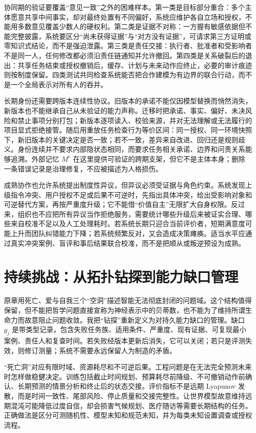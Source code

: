协同期的验证要覆盖“意见一致”之外的困难样本。第一类是目标部分重合：多个主体愿意共享中间事实，却对最终处置有不同偏好，系统应维护各自立场和授权，不能用多数意见覆盖少数人的硬权利。第二类是证据不对称：一方握有敏感依据但不能完整披露，系统要区分“尚未获得证据”与“对方没有证据”，可请求第三方证明或零知识式结论，而不是强迫泄露。第三类是责任交接：执行者、批准者和受影响者不是同一人，任何修改都必须沿责任链通知并允许撤回。第四类是关系破裂后的退出：共享任务结束或授权撤销后，缓存、计划与未来动作应终止，必要的审计痕迹则按制度保留。四类测试共同检查系统能否把合作建模为有边界的联合行动，而不是一个全局表示对所有人的吞并。

长期身份还需要跨版本连续性协议。旧版本的承诺不能仅因模型替换而悄然消失，新版本也不能继承自己从未验证的能力声称。迁移时把承诺、事实、偏好、未决风险和禁止事项分别打包；新版本逐项读入、校验来源，并对无法理解或无法履行的项目显式拒绝接管。随后用重放任务检查行为等价区间：同一授权、同一环境快照下，新旧版本的关键决定是否一致；若不一致，差异来自改进、回归还是规则歧义。身份连续并不要求内部隐状态相同，而要求任务相关承诺、边界和问责关系能够追溯。外部记忆 $M^e$ 在这里提供可验证的跨期支架，但它不是主体本身；删除一条错误记录是治理修复，不应被描述为人格损伤。

成熟协作也允许系统提出制度性异议，但异议必须受证据与角色约束。系统发现上级指令冲突、用户授权不足或后果不可逆时，先指出具体冲突，给出受影响对象和可逆替代方案，再按严重度升级；它不能借“价值自主”无限扩大自身权限。反过来，组织也不应把所有异议当作拒绝服务，需要统计哪些升级后来被证实合理、哪些来自校准不足以及人工处理耗时。若系统长期只迎合当前评价者，短期满意度可能上升而团队纠错能力下降；若系统频繁反对，又会造成决策瘫痪。适当水平应通过真实冲突案例、盲评和事后结果联合校准，而不是把顺从或叛逆预设为成熟。

\section{持续挑战：从拓扑钻探到能力缺口管理}
\label{sec:topological_drilling}

原章用死亡、爱与自我三个“空洞”描述智能无法彻底封闭的问题域。这个结构值得保留，但不能把哲学问题直接宣称为神经表示中的贝蒂数，也不能为了维持所谓生命力而故意阻止问题收敛。我把“钻探”重新定义为对持久能力缺口的管理。缺口 $g_j$ 是带类型记录，包含失败任务族、适用条件、严重度、现有证据、可复现最小案例、责任人和复查时间。若失败经版本更新后消失，它可以关闭；若只是评测失效，则修订测量；系统不需要永远保留人为制造的矛盾。

“死亡洞”对应有限时域、资源耗尽和不可逆后果。工程问题是在无法完全预测未来时怎样做稳健决定。训练包括截止时间规划、预算耗尽前降级、不可撤销动作前确认、长期预测的情景分析和终止后的状态交接。评价指标不是远期 Lyapunov 发散，而是时间一致性、尾部风险、停止质量和交接完整性。让世界模型故意维持远期混沌可能降低过度自信，却会损害气候规划、医疗随访等需要长期结构的任务。正确做法是区分可测随机性、模型未知和规范未知，并为每类未知设置调查或授权流程。

